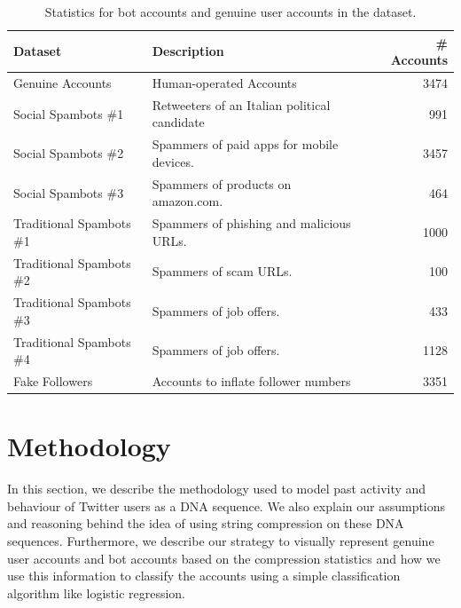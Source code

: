 \documentclass{llncs}
\begin{document}
\begin{table}
\caption{Statistics for bot accounts and genuine user accounts in the dataset.}\label{tab:datastats}
\begin{tabularx}{\textwidth}{X l r}
\hline
\textbf{Dataset} & \textbf{Description} & \textbf{\# Accounts }\\
\hline
Genuine Accounts & Human-operated Accounts & 3474 \\
 \hline
 Social Spambots \#1 & Retweeters of an Italian political candidate & 991\\
 Social Spambots \#2 & Spammers of paid apps for mobile devices. & 3457\\
 Social Spambots \#3 & Spammers of products on amazon.com. & 464\\
 \hline
 Traditional Spambots \#1 & Spammers of phishing and malicious URLs. & 1000\\
 Traditional Spambots \#2 & Spammers of scam URLs. & 100\\
 Traditional Spambots \#3 & Spammers of job offers. & 433\\
 Traditional Spambots \#4 & Spammers of job offers. & 1128 \\
 \hline
 Fake Followers & Accounts to inflate follower numbers & 3351 \\ 
 \hline
\end{tabularx}
\end{table}

\section{Methodology}

In this section, we describe the methodology used to model past activity and behaviour of Twitter users as a DNA sequence. We also explain our assumptions and reasoning behind the idea of using string compression on these DNA sequences. Furthermore, we describe our strategy to visually represent genuine user accounts and bot accounts based on the compression statistics and how we use this information to classify the accounts using a simple classification algorithm like logistic regression.
\end{document}
